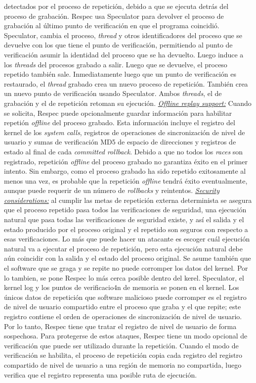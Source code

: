 detectados por el proceso de repetición, debido a que se ejecuta detrás del proceso de grabación. Respec usa Speculator para devolver el proceso de grabación al último punto de verificación en que el programa coincidió. Speculator, cambia el proceso, \emph{thread} y otros identificadores del proceso que se devuelve con los que tiene el punto de verificación, permitiendo al punto de verificación asumir la identidad del proceso que se ha devuelto. Luego induce a los \emph{threads} del procesos grabado a salir. Luego que se devuelve, el proceso repetido también sale. Inmediatamente luego que un punto de verificación es restaurado, el \emph{thread} grabado crea un nuevo proceso de repetición. También crea un nuevo punto de verificación usando Speculator. Ambos \emph{threads}, el de grabación y el de repetición retoman su ejecución. \underline{\emph{Offline replay support:}} Cuando se solicita, Respec puede opcionalmente guardar información para habilitar repetión \emph{offline} del proceso grabado. Esta información incluye el registro del kernel de los \emph{system calls}, registros de operaciones de sincronización de nivel de usuario y sumas de verificación MD5 de espacio de direcciones y registros de estado al final de cada \emph{committed rollback}. Debido a que no todos los \emph{races} son registrado, repetición \emph{offline} del proceso grabado no garantiza éxito en el primer intento. Sin embargo, como el proceso grabado ha sido repetido exitosamente al menos una vez, es probable que la repetición \emph{offline} tendrá éxito eventualmente, aunque puede requerir de un número de \emph{rollbacks} y reintentos. \underline{\emph{Security considerations:}} al cumplir las metas de repetición externa determinista se asegura que el proceso repetido pasa todos las verificaciones de seguridad, una ejecución natural que pasa todas las verificaciones de seguridad existe, y así el salida y el estado producido por el proceso original y el repetido son seguros con respecto a esas verificaciones. Lo más que puede hacer un atacante es escoger cuál ejecución natural va a ejecutar el proceso de repetición, pero esta ejecución natural debe aún coincidir con la salida y el estado del proceso original. Se asume también que el software que se graga y se repite no puede corromper los datos del kernel. Por lo tambien, se pone Respec lo más cerca posible dentro del kerel. Speculator, el kernel log y los puntos de verificacio4n de memoria se ponen en el kernel. Los únicos datos de repetición que software malicioso puede corromper es el registro de nivel de usuario compartido entre el proceso que graba y el que repite; este registro contiene el orden de operaciones de sincronización de nivel de usuario. Por lo tanto, Respec tiene que tratar el registro de nivel de usuario de forma sospechosa. Para protegerse de estos ataques, Respec tiene un modo opcional de verificación que puede ser utilizado durante la repetición. Cuando el modo de verificación se habilita, el proceso de repetición copia cada registro del registro compartido de nivel de usuario a una región de memoria no compartida, luego verifica que el registro representa una posible ruta de ejecución.

